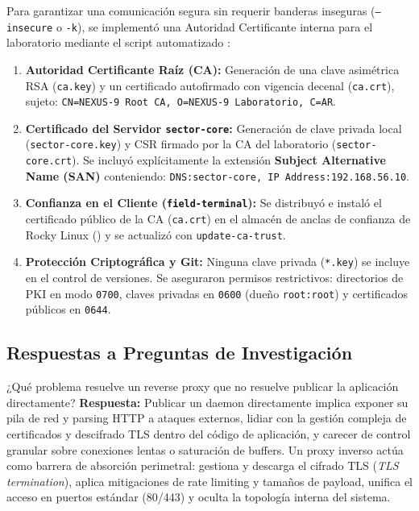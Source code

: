 \documentclass[10pt,a4paper]{article}
\begin{document}
Para garantizar una comunicación segura sin requerir banderas inseguras (\texttt{--insecure} o \texttt{-k}), se implementó una Autoridad Certificante interna para el laboratorio mediante el script automatizado :
\begin{enumerate}[leftmargin=*]
    \item \textbf{Autoridad Certificante Raíz (CA):} Generación de una clave asimétrica RSA (\texttt{ca.key}) y un certificado autofirmado con vigencia decenal (\texttt{ca.crt}), sujeto: \texttt{CN=NEXUS-9 Root CA, O=NEXUS-9 Laboratorio, C=AR}.
    \item \textbf{Certificado del Servidor \texttt{sector-core}:} Generación de clave privada local (\texttt{sector-core.key}) y CSR firmado por la CA del laboratorio (\texttt{sector-core.crt}). Se incluyó explícitamente la extensión \textbf{Subject Alternative Name (SAN)} conteniendo:
    \texttt{DNS:sector-core, IP Address:192.168.56.10}.
    \item \textbf{Confianza en el Cliente (\texttt{field-terminal}):} Se distribuyó e instaló el certificado público de la CA (\texttt{ca.crt}) en el almacén de anclas de confianza de Rocky Linux () y se actualizó con \texttt{update-ca-trust}.
    \item \textbf{Protección Criptográfica y Git:} Ninguna clave privada (\texttt{*.key}) se incluye en el control de versiones. Se aseguraron permisos restrictivos: directorios de PKI en modo \texttt{0700}, claves privadas en \texttt{0600} (dueño \texttt{root:root}) y certificados públicos en \texttt{0644}.
\end{enumerate}

\subsection{Respuestas a Preguntas de Investigación}

\begin{pregunta}{¿Qué problema resuelve un reverse proxy que no resuelve publicar la aplicación directamente?}
    \textbf{Respuesta:} Publicar un daemon directamente implica exponer su pila de red y parsing HTTP a ataques externos, lidiar con la gestión compleja de certificados y descifrado TLS dentro del código de aplicación, y carecer de control granular sobre conexiones lentas o saturación de buffers. Un proxy inverso actúa como barrera de absorción perimetral: gestiona y descarga el cifrado TLS (\textit{TLS termination}), aplica mitigaciones de rate limiting y tamaños de payload, unifica el acceso en puertos estándar (80/443) y oculta la topología interna del sistema.
\end{pregunta}
\end{document}
